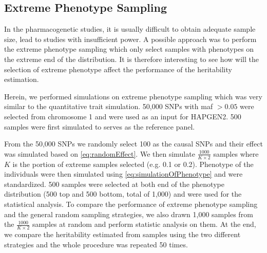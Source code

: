 		\subsection{Extreme Phenotype Sampling}
		In the pharmacogenetic studies, it is usually difficult to obtain adequate sample size, lead to studies with insufficient power.
		A possible approach was to perform the extreme phenotype sampling which only select samples with phenotypes on the extreme end of the distribution.
		It is therefore interesting to see how will the selection of extreme phenotype affect the performance of the heritability estimation.
		
		Herein, we performed simulations on extreme phenotype sampling which was very similar to the quantitative trait simulation.
		50,000 \glspl{SNP} with \gls{maf} $>0.05$ were selected from chromosome 1 and were used as an input for HAPGEN2.
		500 samples were first simulated to serves as the reference panel. 
		
		From the 50,000 \glspl{SNP} we randomly select 100 as the causal \glspl{SNP} and their effect was simulated based on \cref{eq:randomEffect}.
		We then simulate $\frac{1000}{K\times2}$ samples where $K$ is the portion of extreme samples selected (e.g. 0.1 or 0.2).
		Phenotype of the individuals were then simulated using \cref{eq:simulationOfPhenotype} and were standardized.
		500 samples were selected at both end of the phenotype distribution (500 top and 500 bottom, total of 1,000) and were used for the statistical analysis. 
		To compare the performance of extreme phenotype sampling and the general random sampling strategies, we also drawn 1,000 samples from the $\frac{1000}{K\times2}$ samples at random and perform statistic analysis on them.
		At the end, we compare the heritability estimated from samples using the two different strategies and the whole procedure was repeated 50 times. 
		
